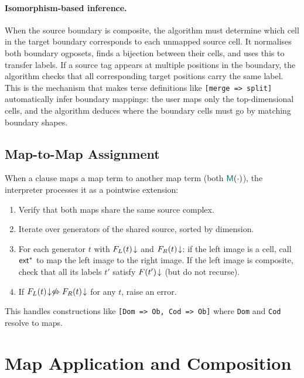\documentclass[acmsmall,screen,nonacm]{acmart}
\begin{document}
\paragraph{Isomorphism-based inference.}
When the source boundary is composite, the algorithm must determine which
cell in the target boundary corresponds to each unmapped source cell.
It normalises both boundary ogposets, finds a bijection between their
cells, and uses this to transfer labels. If a source tag appears at
multiple positions in the boundary, the algorithm checks that all
corresponding target positions carry the same label. This is the mechanism
that makes terse definitions like \texttt{[merge => split]} automatically
infer boundary mappings: the user maps only the top-dimensional cells,
and the algorithm deduces where the boundary cells must go by matching
boundary shapes.

\subsection{Map-to-Map Assignment}
\label{sec:pmap:mapassign}

When a clause maps a map term to another map term (both $\MTerm{\cdot}$),
the interpreter processes it as a pointwise extension:
\begin{enumerate}
  \item Verify that both maps share the same source complex.
  \item Iterate over generators of the shared source, sorted by dimension.
  \item For each generator $t$ with $F_L(t)\!\downarrow$ and $F_R(t)\!\downarrow$: if the
    left image is a cell, call $\mathsf{ext}^{*}$ to map the left image to the
    right image. If the left image is composite, check that all its
    labels $t'$ satisfy $F(t')\!\downarrow$ (but do not recurse).
  \item If $F_L(t)\!\downarrow \not\Leftrightarrow F_R(t)\!\downarrow$ for any $t$, raise an error.
\end{enumerate}

This handles constructions like \texttt{[Dom => Ob, Cod => Ob]} where
\texttt{Dom} and \texttt{Cod} resolve to maps.

\section{Map Application and Composition}
\label{sec:apply}
\end{document}
